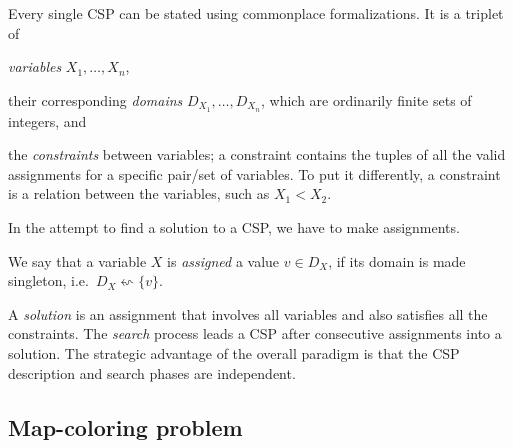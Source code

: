 \documentclass{ws-ijait}
\begin{document}
Every single CSP can be stated using commonplace
formalizations. It is a triplet of
\begin{romanlist}
  \item \emph{variables} $X_1, \ldots, X_n$,
  \item their corresponding \emph{domains} $D_{X_1}, \ldots,
        D_{X_n}$, which are ordinarily finite sets of
        integers, and
  \item the \emph{constraints} between variables; a
        constraint contains the tuples of all the valid
        assignments for a specific pair\slash set of
        variables. To put it differently, a constraint is a
        relation between the variables, such as $X_1 < X_2$.
\end{romanlist}
In the attempt to find a solution to a CSP, we have to make
assignments.
\begin{definition}
  We say that a variable $X$ is \emph{assigned} a value $v
  \in D_X$, if its domain is made singleton, i.e.\ $D_X
  \leftsquigarrow \{v\}$.
\end{definition}
A \emph{solution} is an assignment that involves all
variables and also satisfies all the constraints. The
\emph{search} process leads a CSP after consecutive
assignments into a solution. The strategic advantage of the
overall paradigm is that the CSP description and search
phases are independent.\cite{grand-challenges}

\subsection{Map-coloring problem}
\end{document}
